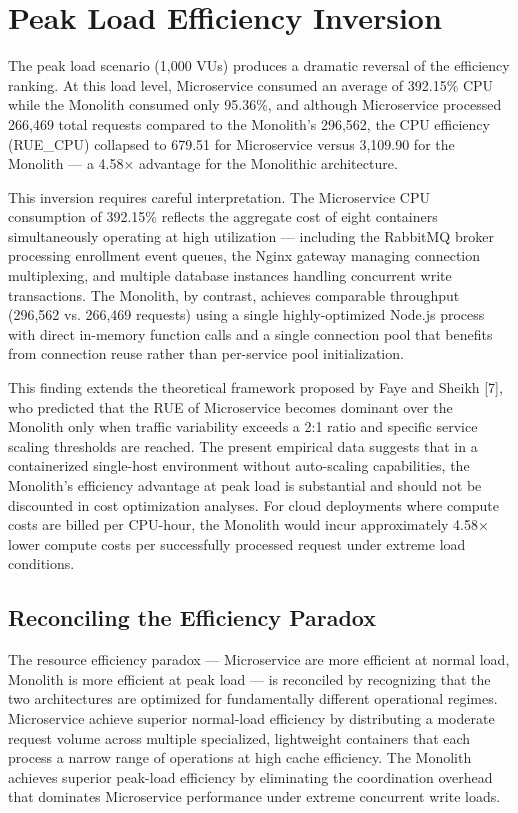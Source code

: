 \section{Peak Load Efficiency Inversion}

The peak load scenario (1,000 VUs) produces a dramatic reversal of the efficiency ranking. At this load level, Microservice consumed an average of 392.15\% CPU while the Monolith consumed only 95.36\%, and although Microservice processed 266,469 total requests compared to the Monolith's 296,562, the CPU efficiency (RUE\_CPU) collapsed to 679.51 for Microservice versus 3,109.90 for the Monolith — a 4.58× advantage for the Monolithic architecture.

This inversion requires careful interpretation. The Microservice CPU consumption of 392.15\% reflects the aggregate cost of eight containers simultaneously operating at high utilization — including the RabbitMQ broker processing enrollment event queues, the Nginx gateway managing connection multiplexing, and multiple database instances handling concurrent write transactions. The Monolith, by contrast, achieves comparable throughput (296,562 vs. 266,469 requests) using a single highly-optimized Node.js process with direct in-memory function calls and a single connection pool that benefits from connection reuse rather than per-service pool initialization.

This finding extends the theoretical framework proposed by Faye and Sheikh [7], who predicted that the RUE of Microservice becomes dominant over the Monolith only when traffic variability exceeds a 2:1 ratio and specific service scaling thresholds are reached. The present empirical data suggests that in a containerized single-host environment without auto-scaling capabilities, the Monolith's efficiency advantage at peak load is substantial and should not be discounted in cost optimization analyses. For cloud deployments where compute costs are billed per CPU-hour, the Monolith would incur approximately 4.58× lower compute costs per successfully processed request under extreme load conditions.

\subsection{Reconciling the Efficiency Paradox}

The resource efficiency paradox — Microservice are more efficient at normal load, Monolith is more efficient at peak load — is reconciled by recognizing that the two architectures are optimized for fundamentally different operational regimes. Microservice achieve superior normal-load efficiency by distributing a moderate request volume across multiple specialized, lightweight containers that each process a narrow range of operations at high cache efficiency. The Monolith achieves superior peak-load efficiency by eliminating the coordination overhead that dominates Microservice performance under extreme concurrent write loads.

